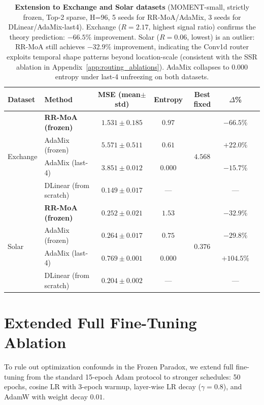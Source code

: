 \documentclass{article}
\begin{document}
\begin{table}[!htbp]
\centering
\caption{\textbf{Extension to Exchange and Solar datasets} (MOMENT-small, strictly frozen, Top-2 sparse, H=96, 5 seeds for RR-MoA/AdaMix, 3 seeds for DLinear/AdaMix-last4). Exchange ($R{=}2.17$, highest signal ratio) confirms the theory prediction: $-66.5\%$ improvement. Solar ($R{=}0.06$, lowest) is an outlier: RR-MoA still achieves $-32.9\%$ improvement, indicating the Conv1d router exploits temporal shape patterns beyond location-scale (consistent with the SSR ablation in Appendix~\ref{app:routing_ablations}). AdaMix collapses to $0.000$ entropy under last-4 unfreezing on both datasets.}
\label{tab:exchange_solar}
\small
\begin{tabular}{@{}llccccc@{}}
\toprule
Dataset & Method & MSE (mean$\pm$std) & Entropy & Best fixed & $\Delta$\% \\
\midrule
\multirow{4}{*}{Exchange} & \textbf{RR-MoA (frozen)} & $\mathbf{1.531 \pm 0.185}$ & $0.97$ & \multirow{4}{*}{$4.568$} & $\mathbf{-66.5\%}$ \\
 & AdaMix (frozen) & $5.571 \pm 0.511$ & $0.61$ & & $+22.0\%$ \\
 & AdaMix (last-4) & $3.851 \pm 0.012$ & $\mathbf{0.000}$ & & $-15.7\%$ \\
 & \cellcolor{gray!8} DLinear (from scratch) & \cellcolor{gray!8} $0.149 \pm 0.017$ & \cellcolor{gray!8} --- & & \cellcolor{gray!8} --- \\
\midrule
\multirow{4}{*}{Solar} & \textbf{RR-MoA (frozen)} & $\mathbf{0.252 \pm 0.021}$ & $1.53$ & \multirow{4}{*}{$0.376$} & $\mathbf{-32.9\%}$ \\
 & AdaMix (frozen) & $0.264 \pm 0.017$ & $0.75$ & & $-29.8\%$ \\
 & AdaMix (last-4) & $0.769 \pm 0.001$ & $\mathbf{0.000}$ & & $+104.5\%$ \\
 & \cellcolor{gray!8} DLinear (from scratch) & \cellcolor{gray!8} $0.204 \pm 0.002$ & \cellcolor{gray!8} --- & & \cellcolor{gray!8} --- \\
\bottomrule
\end{tabular}
\end{table}

\section{Extended Full Fine-Tuning Ablation}
\label{app:extended_ft}

To rule out optimization confounds in the Frozen Paradox, we extend full fine-tuning from the standard 15-epoch Adam protocol to stronger schedules: 50 epochs, cosine LR with 3-epoch warmup, layer-wise LR decay ($\gamma{=}0.8$), and AdamW with weight decay $0.01$.
\end{document}
